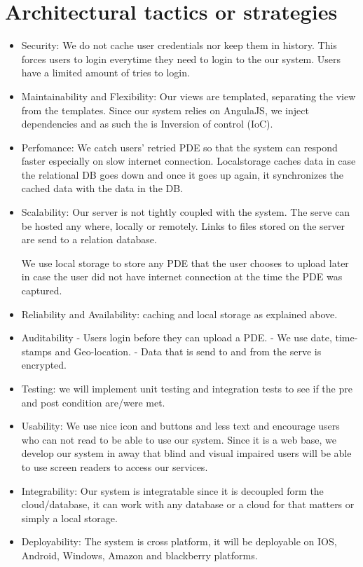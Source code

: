 \documentclass[a4paper,12pt]{article}
\begin{document}
\section{Architectural tactics or strategies}
\begin{itemize}
\item Security: We do not cache user credentials nor keep them in history. This forces users to login everytime they need to login to the our system.  Users have a limited amount of tries to login. 
\item Maintainability and Flexibility: Our views are templated, separating the view from the templates. Since our system relies on AngulaJS, we inject dependencies and as such the is Inversion of control (IoC).
\item Perfomance: We catch users' retried PDE so that the system can respond faster especially on slow internet connection. Localstorage caches data in case the relational DB goes down and once it goes up again, it synchronizes the cached data with the data in the DB.
\item Scalability: Our server is not tightly coupled with the system. The serve can be hosted any where, locally or remotely. Links to files stored on the server are send to a relation database.

We use local storage to store any PDE that the user chooses to upload later in case the user did not have internet connection at the time the PDE was captured.
\item Reliability and Availability: caching and local storage as explained above.
\item Auditability - Users login before they can upload a PDE.
	- We use date, time-stamps and Geo-location.
	- Data that is send to and from the serve is encrypted.
\item Testing: we will implement unit testing and integration tests to see if the pre and post condition are/were met.
\item Usability: We use nice icon and buttons and less text and encourage users who can not read to be able to use our system. Since it is a web base, we develop our system in away that blind and visual impaired users will be able to use screen readers to access our services.
\item Integrability: Our system is integratable since it is decoupled form the cloud/database, it can work with any database or a cloud for that matters or simply a local storage. 
\item Deployability: The system is cross platform, it will be deployable on IOS, Android, Windows, Amazon and blackberry platforms.	
\end{itemize}
\end{document}
